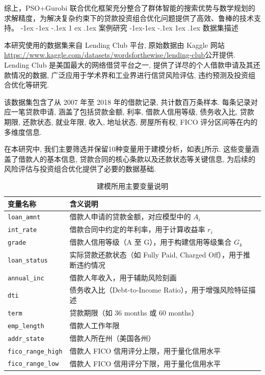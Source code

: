 \documentclass{write_paper}
\makeatletter
\renewcommand\section{\@startsection {section}{1}{\z@}%
                                   {-1ex \@plus -1ex \@minus -.1ex}%
                                   {1 ex \@plus.1ex}%
                                   {\normalfont\large\bfseries}}
\renewcommand\subsection{\@startsection{subsection}{2}{\z@}%
                                     {-1ex\@plus -1ex \@minus -.1ex}%
                                     {1ex \@plus .1ex}%
                                     {\normalfont \normalsize \bfseries}}
\makeatother
\begin{document}
综上，PSO+Gurobi 联合优化框架充分整合了群体智能的搜索优势与数学规划的求解精度，为解决复杂约束下的贷款投资组合优化问题提供了高效、鲁棒的技术支持。
\section{案例研究}
\label{sec:case_study}
\subsection{数据集描述}

\label{subsec:dataset_description}

本研究使用的数据集来自 Lending Club 平台, 原始数据由 Kaggle 网站\url{https://www.kaggle.com/datasets/wordsforthewise/lending-club}公开提供. Lending Club 是美国最大的网络借贷平台之一, 提供了详尽的个人借款申请及其还款情况的数据, 广泛应用于学术界和工业界进行信贷风险评估, 违约预测及投资组合优化等研究. 

该数据集包含了从 2007 年至 2018 年的借款记录, 共计数百万条样本. 每条记录对应一笔贷款申请, 涵盖了包括贷款金额, 利率, 借款人信用等级, 债务收入比, 贷款期限, 还款状态, 就业年限, 收入, 地址状态, 房屋所有权, FICO 评分区间等在内的多维度信息. 

在本研究中, 我们主要筛选并保留10种变量用于建模分析，如表\ref{tab:dataset_variables}所示. 这些变量涵盖了借款人的基本信息, 贷款合同的核心条款以及还款状态等关键信息, 为后续的风险评估与投资组合优化提供了必要的数据基础.
\begin{table}[htbp]
\centering
\caption{建模所用主要变量说明}
\label{tab:dataset_variables}
\begin{tabular}{ll}
\toprule
变量名称 & 含义说明 \\
\midrule
\texttt{loan\_amnt} & 借款人申请的贷款金额，对应模型中的 $A_i$ \\
\texttt{int\_rate} & 借款合同中约定的年利率，用于计算收益率 $r_i$ \\
\texttt{grade} & 借款人信用等级（A 至 G），用于构建信用等级集合 $G_k$ \\
\texttt{loan\_status} & 实际贷款还款状态（如 Fully Paid, Charged Off），用于推断违约情况 \\
\texttt{annual\_inc} & 借款人年收入，用于辅助风险刻画 \\
\texttt{dti} & 债务收入比（Debt-to-Income Ratio），用于增强风险特征描述 \\
\texttt{term} & 贷款期限（如 36 months 或 60 months） \\
\texttt{emp\_length} & 借款人工作年限 \\
\texttt{addr\_state} & 借款人所在州（美国各州） \\
\texttt{fico\_range\_high} & 借款人 FICO 信用评分上限，用于量化信用水平 \\
\texttt{fico\_range\_low} & 借款人 FICO 信用评分下限，用于量化信用水平 \\
\bottomrule
\end{tabular}
\end{table}
 
\end{document}

